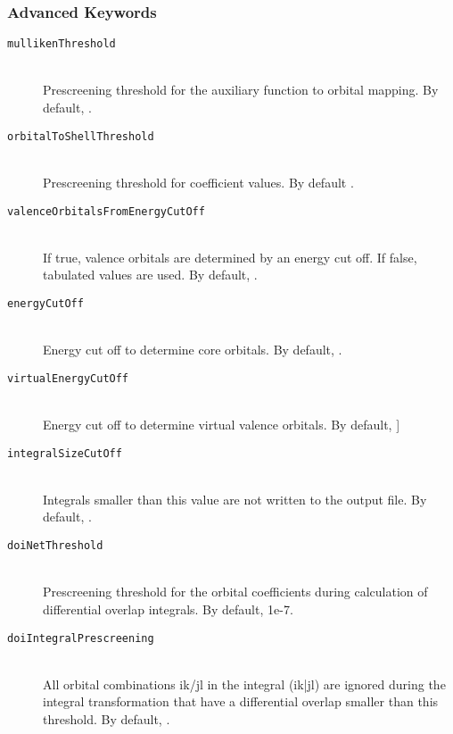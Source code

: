 \subsubsection{Advanced Keywords}
\begin{description}
    \item [\texttt{mullikenThreshold}]\hfill \\
    Prescreening threshold for the auxiliary function to orbital mapping. By default, .
    \item [\texttt{orbitalToShellThreshold}]\hfill \\
    Prescreening threshold for coefficient values. By default .
    \item [\texttt{valenceOrbitalsFromEnergyCutOff}]\hfill \\
    If true, valence orbitals are determined by an energy cut off. If false, tabulated values are used. By default, .
    \item[\texttt{energyCutOff}]\hfill \\
    Energy cut off to determine core orbitals. By default, .
    \item[\texttt{virtualEnergyCutOff}]\hfill \\
    Energy cut off to determine virtual valence orbitals. By default, ]
    \item[\texttt{integralSizeCutOff}]\hfill \\
    Integrals smaller than this value are not written to the output file. By default, .
    \item[\texttt{doiNetThreshold}]\hfill \\
    Prescreening threshold for the orbital coefficients during calculation of differential overlap integrals. By default, 1e-7.
    \item[\texttt{doiIntegralPrescreening}]\hfill \\
    All orbital combinations ik/jl in the integral (ik|jl) are ignored during the integral transformation that have a
    differential overlap smaller than this threshold. By default, .
\end{description}